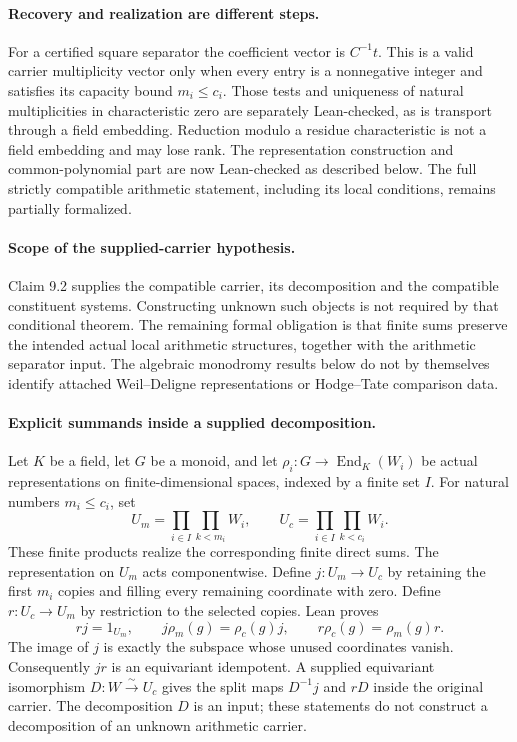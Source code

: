 \documentclass[11pt]{article}
\theoremstyle{definition}
\theoremstyle{remark}
\begin{document}
\paragraph{Recovery and realization are different steps.}
For a certified square separator the coefficient vector is $C^{-1}t$.
This is a valid carrier multiplicity vector only when every entry is a
nonnegative integer and satisfies its capacity bound $m_i\le c_i$.
Those tests and uniqueness of natural multiplicities in characteristic zero
are separately Lean-checked, as is transport through a field embedding.
Reduction modulo a residue characteristic is not a field embedding and may
lose rank. The representation construction and common-polynomial part are now
Lean-checked as described below. The full strictly compatible arithmetic
statement, including its local conditions, remains partially formalized.

\paragraph{Scope of the supplied-carrier hypothesis.}
Claim 9.2 supplies the compatible carrier, its decomposition and the compatible
constituent systems. Constructing unknown such objects is not required by that
conditional theorem. The remaining formal obligation is that finite sums preserve
the intended actual local arithmetic structures, together with the arithmetic
separator input. The algebraic monodromy results below do not by themselves
identify attached Weil--Deligne representations or Hodge--Tate comparison data.

\paragraph{Explicit summands inside a supplied decomposition.}
Let $K$ be a field, let $G$ be a monoid, and let
$\rho_i:G\to\operatorname{End}_K(W_i)$ be actual representations on
finite-dimensional spaces, indexed by a finite set $I$. For natural numbers
$m_i\le c_i$, set
\[
 U_m=\prod_{i\in I}\prod_{k<m_i}W_i,
 \qquad U_c=\prod_{i\in I}\prod_{k<c_i}W_i.
\]
These finite products realize the corresponding finite direct sums. The
representation on $U_m$ acts componentwise. Define $j:U_m\to U_c$ by retaining
the first $m_i$ copies and filling every remaining coordinate with zero.
Define $r:U_c\to U_m$ by restriction to the selected copies. Lean proves
\[
 rj=1_{U_m},\qquad
 j\rho_m(g)=\rho_c(g)j,\qquad
 r\rho_c(g)=\rho_m(g)r.
\]
The image of $j$ is exactly the subspace whose unused coordinates vanish.
Consequently $jr$ is an equivariant idempotent. A supplied equivariant
isomorphism $D:W\xrightarrow{\sim}U_c$ gives the split maps
$D^{-1}j$ and $rD$ inside the original carrier. The decomposition $D$ is an
input; these statements do not construct a decomposition of an unknown
arithmetic carrier.
\end{document}
